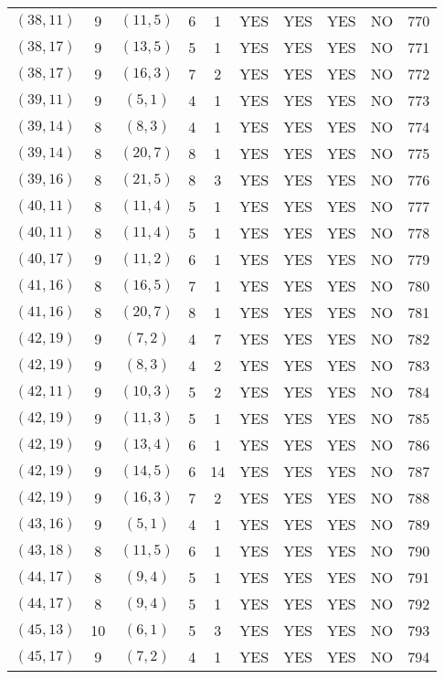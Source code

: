 \begin{longtable}{|c|c|c|c|c|c|c|c|c|c|}
$(38, 11)$ & 9 & $(11, 5)$ & 6 & 1 & YES & YES & YES & NO & 770\\
$(38, 17)$ & 9 & $(13, 5)$ & 5 & 1 & YES & YES & YES & NO & 771\\
$(38, 17)$ & 9 & $(16, 3)$ & 7 & 2 & YES & YES & YES & NO & 772\\
$(39, 11)$ & 9 & $(5, 1)$ & 4 & 1 & YES & YES & YES & NO & 773\\
$(39, 14)$ & 8 & $(8, 3)$ & 4 & 1 & YES & YES & YES & NO & 774\\
$(39, 14)$ & 8 & $(20, 7)$ & 8 & 1 & YES & YES & YES & NO & 775\\
$(39, 16)$ & 8 & $(21, 5)$ & 8 & 3 & YES & YES & YES & NO & 776\\
$(40, 11)$ & 8 & $(11, 4)$ & 5 & 1 & YES & YES & YES & NO & 777\\
$(40, 11)$ & 8 & $(11, 4)$ & 5 & 1 & YES & YES & YES & NO & 778\\
$(40, 17)$ & 9 & $(11, 2)$ & 6 & 1 & YES & YES & YES & NO & 779\\
$(41, 16)$ & 8 & $(16, 5)$ & 7 & 1 & YES & YES & YES & NO & 780\\
$(41, 16)$ & 8 & $(20, 7)$ & 8 & 1 & YES & YES & YES & NO & 781\\
$(42, 19)$ & 9 & $(7, 2)$ & 4 & 7 & YES & YES & YES & NO & 782\\
$(42, 19)$ & 9 & $(8, 3)$ & 4 & 2 & YES & YES & YES & NO & 783\\
$(42, 11)$ & 9 & $(10, 3)$ & 5 & 2 & YES & YES & YES & NO & 784\\
$(42, 19)$ & 9 & $(11, 3)$ & 5 & 1 & YES & YES & YES & NO & 785\\
$(42, 19)$ & 9 & $(13, 4)$ & 6 & 1 & YES & YES & YES & NO & 786\\
$(42, 19)$ & 9 & $(14, 5)$ & 6 & 14 & YES & YES & YES & NO & 787\\
$(42, 19)$ & 9 & $(16, 3)$ & 7 & 2 & YES & YES & YES & NO & 788\\
$(43, 16)$ & 9 & $(5, 1)$ & 4 & 1 & YES & YES & YES & NO & 789\\
$(43, 18)$ & 8 & $(11, 5)$ & 6 & 1 & YES & YES & YES & NO & 790\\
$(44, 17)$ & 8 & $(9, 4)$ & 5 & 1 & YES & YES & YES & NO & 791\\
$(44, 17)$ & 8 & $(9, 4)$ & 5 & 1 & YES & YES & YES & NO & 792\\
$(45, 13)$ & 10 & $(6, 1)$ & 5 & 3 & YES & YES & YES & NO & 793\\
$(45, 17)$ & 9 & $(7, 2)$ & 4 & 1 & YES & YES & YES & NO & 794\\

\end{longtable}

